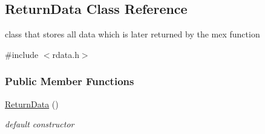 \hypertarget{classamici_1_1_return_data}{}\subsection{Return\+Data Class Reference}
\label{classamici_1_1_return_data}


class that stores all data which is later returned by the mex function  




{\ttfamily \#include $<$rdata.\+h$>$}

\subsubsection*{Public Member Functions}
\begin{DoxyCompactItemize}
\item 
\mbox{\label{classamici_1_1_return_data_a4ce4db6c8f0e0ac9f21f708d042c30e5}} 
\mbox{\hyperlink{classamici_1_1_return_data_a4ce4db6c8f0e0ac9f21f708d042c30e5}{Return\+Data}} ()
\begin{DoxyCompactList}\small\item\em default constructor \end{DoxyCompactList}\item 

\end{DoxyCompactItemize}
